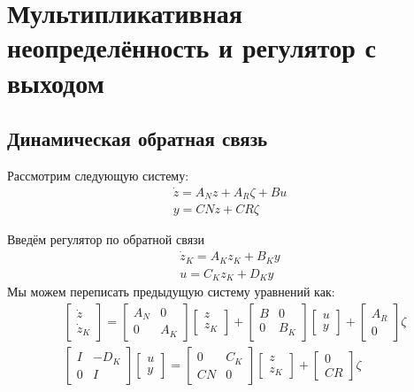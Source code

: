 \chapter{Мультипликативная неопределённость и регулятор с выходом}\label{ch:ch5}
\section{Динамическая обратная связь}\label{sec:ch5/sect1}
Рассмотрим следующую систему:
\begin{align}
	\dot{{z}} = {A}_N {z} + {A}_R {\zeta} + {B} {u}\\
	{y} = {C} {N} {z} + {C} {R} {\zeta}
\end{align}

Введём регулятор по обратной связи
\begin{align}
	\dot{{z}}_K = {A}_K {z}_K + {B}_K {y}\\
	{u} = {C}_K {z}_K + {D}_K {y}
\end{align}
Мы можем переписать предыдущую систему уравнений как:
\begin{align}
	&\begin{bmatrix}
		{\dot{z}} \\ {\dot{z}}_K
	\end{bmatrix}
	=
	\begin{bmatrix}
		{A}_N & 0 \\
		0 & {A}_K
	\end{bmatrix}
	\begin{bmatrix}
		{z} \\ {z}_K 
	\end{bmatrix}
	+
	\begin{bmatrix}
		{B} & 0 \\
		0 & {B}_K 
	\end{bmatrix}
	\begin{bmatrix}
		{u} \\ {y}
	\end{bmatrix}
	+
	\begin{bmatrix}
		{A}_R \\ 0 
	\end{bmatrix}
	\zeta
	\\
	& \begin{bmatrix}
		{I} & -{D}_K \\
		0 & {I}
	\end{bmatrix}
	\begin{bmatrix}
		{u} \\ {y}
	\end{bmatrix}
	=
	\begin{bmatrix}
		0 & {C}_K \\
		{C} {N} & 0
	\end{bmatrix}
	\begin{bmatrix}
		{z} \\ {z}_K
	\end{bmatrix}
	+
	\begin{bmatrix}
		0 \\ {C} {R}
	\end{bmatrix}{\zeta}
\end{align}

